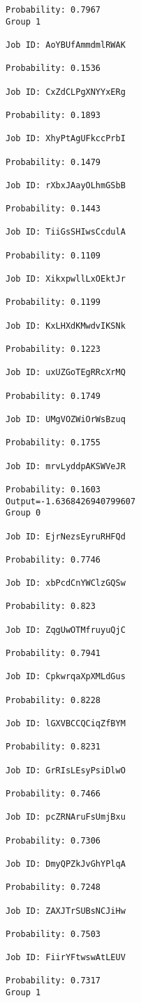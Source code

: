 \documentclass[11pt]{article}
\begin{document}
\begin{Verbatim}[commandchars=\\\{\}]
Probability: 0.7967
Group 1

Job ID: AoYBUfAmmdmlRWAK

Probability: 0.1536

Job ID: CxZdCLPgXNYYxERg

Probability: 0.1893

Job ID: XhyPtAgUFkccPrbI

Probability: 0.1479

Job ID: rXbxJAayOLhmGSbB

Probability: 0.1443

Job ID: TiiGsSHIwsCcdulA

Probability: 0.1109

Job ID: XikxpwllLxOEktJr

Probability: 0.1199

Job ID: KxLHXdKMwdvIKSNk

Probability: 0.1223

Job ID: uxUZGoTEgRRcXrMQ

Probability: 0.1749

Job ID: UMgVOZWiOrWsBzuq

Probability: 0.1755

Job ID: mrvLyddpAKSWVeJR

Probability: 0.1603
Output=-1.6368426940799607
Group 0

Job ID: EjrNezsEyruRHFQd

Probability: 0.7746

Job ID: xbPcdCnYWClzGQSw

Probability: 0.823

Job ID: ZqgUwOTMfruyuQjC

Probability: 0.7941

Job ID: CpkwrqaXpXMLdGus

Probability: 0.8228

Job ID: lGXVBCCQCiqZfBYM

Probability: 0.8231

Job ID: GrRIsLEsyPsiDlwO

Probability: 0.7466

Job ID: pcZRNAruFsUmjBxu

Probability: 0.7306

Job ID: DmyQPZkJvGhYPlqA

Probability: 0.7248

Job ID: ZAXJTrSUBsNCJiHw

Probability: 0.7503

Job ID: FiirYFtwswAtLEUV

Probability: 0.7317
Group 1


\end{Verbatim}
\end{document}
